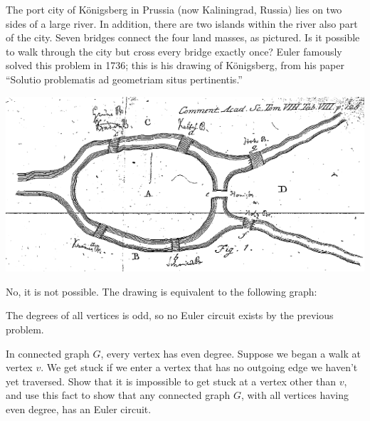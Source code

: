 \documentclass[11pt]{article}
\begin{document}
\begin{problem} %
The port city of K\"{o}nigsberg in Prussia (now Kaliningrad, Russia) lies on two sides of a large river. In addition, there are two islands within the river
also part of the city. Seven bridges connect the four land masses, as pictured. Is it possible to walk through the city but cross every bridge exactly once?
Euler famously solved this problem in 1736; this is his drawing of K\"{o}nigsberg, from his paper ``Solutio problematis ad geometriam situs pertinentis.''
\begin{center}
\includegraphics[width=20cm]{bridges.png}
\end{center}
\end{problem}

\begin{solution}
No, it is not possible. The drawing is equivalent to the following graph:
\begin{center}
\end{center}
The degrees of all vertices is odd, so no Euler circuit exists by the previous problem.
\end{solution}

\begin{problem} %
In connected graph $G$, every vertex has even degree. Suppose we began a walk at vertex $v$. We get stuck if we enter a vertex that has no outgoing edge
we haven't yet traversed. Show that it is impossible to get stuck at a vertex other than $v$, and use this fact to show that any connected graph $G$, with
all vertices having even degree, has an Euler circuit.
\end{problem}
\end{document}
